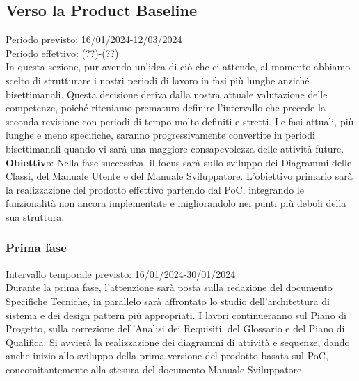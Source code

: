 \subsection{Verso la Product Baseline}
Periodo previsto: 16/01/2024-12/03/2024\\ 
\vspace{0.2cm} 
Periodo effettivo: (??)-(??)\\ 
\vspace{0.2cm} 
In questa sezione, pur avendo un'idea di ciò che ci attende, al momento abbiamo scelto di strutturare i nostri periodi di lavoro in fasi più lunghe anziché bisettimanali. Questa decisione deriva dalla nostra attuale valutazione delle competenze, poiché riteniamo prematuro definire l'intervallo che precede la seconda revisione con periodi di tempo molto definiti e stretti. 
Le fasi attuali, più lunghe e meno specifiche, saranno progressivamente convertite in periodi bisettimanali quando vi sarà una maggiore consapevolezza delle attività future.
\\ 
\vspace{0.2cm} 
\textbf{Obiettiv}o: Nella fase successiva, il focus sarà sullo sviluppo dei Diagrammi delle Classi, del Manuale Utente e del Manuale Sviluppatore. L'obiettivo primario sarà la realizzazione del prodotto effettivo partendo dal PoC, integrando le funzionalità non ancora implementate e migliorandolo nei punti più deboli della sua struttura.\\ 
\vspace{0.2cm} 

\subsubsection{Prima fase}
Intervallo temporale previsto: 16/01/2024-30/01/2024\\ 
\vspace{0.2cm} 
Durante la prima fase, l'attenzione sarà posta sulla redazione del documento Specifiche Tecniche, in parallelo sarà affrontato lo studio dell'architettura di sistema e dei design pattern più appropriati. I lavori continueranno sul Piano di Progetto, sulla correzione dell'Analisi dei Requisiti, del Glossario e del Piano di Qualifica. Si avvierà la realizzazione dei diagrammi di attività e sequenze, dando anche inizio allo sviluppo della prima versione del prodotto basata sul PoC, concomitantemente alla stesura del documento Manuale Sviluppatore.

